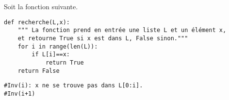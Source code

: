 Soit la fonction suivante.
\begin{lstlisting}
def recherche(L,x):
    """ La fonction prend en entrée une liste L et un élément x,
    et retourne True si x est dans L, False sinon."""
    for i in range(len(L)):
        if L[i]==x:
            return True
    return False
\end{lstlisting}

\ifprof
\begin{corrige}
\begin{lstlisting}
#Inv(i): x ne se trouve pas dans L[0:i].
#Inv(i+1)
\end{lstlisting}
\end{corrige}
\else
\fi